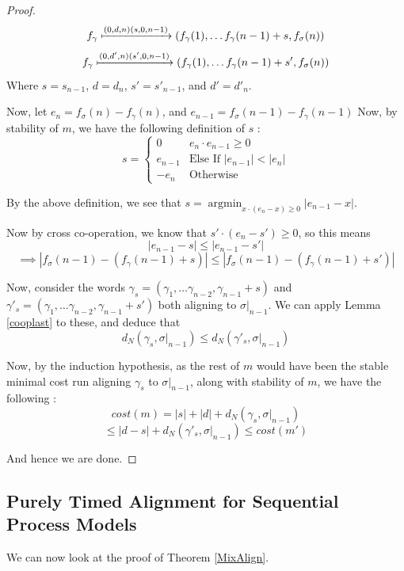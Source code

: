 \documentclass[conference]{IEEEtran}
\newcounter{cases}
\newcounter{subcases}[cases]
\newenvironment{mycase}
{
	\setcounter{cases}{0}
	\setcounter{subcases}{0}
	\newcommand{\case}
	{
		\par\indent\stepcounter{cases}\textbf{Case \thecases.}
	}
	\newcommand{\subcase}
	{
		\par\indent\stepcounter{subcases}\textbf{ \>\>\>\> Subcase (\thesubcases)}
	}
}
{
	\par
}
\renewcommand*\thecases{\arabic{cases}}
\renewcommand*\thesubcases{\alph{subcases}}
\DeclareMathOperator*{\argmin}{argmin}
\begin{document}
\begin{proof}
\begin{mycase}
$$f_\gamma \xmapsto{(0, d, n)(s, 0, n-1)} (f_\gamma(1), \dots f_\gamma(n-1) + s, f_\sigma(n))$$
$$f_\gamma \xmapsto{(0, d', n)(s', 0, n-1)} (f_\gamma(1), \dots f_\gamma(n-1) + s', f_\sigma(n))$$
Where $s = s_{n-1}$, $d = d_n$, $s' = s'_{n-1}$, and $d' = d'_n$. 

Now, let $e_n = f_\sigma(n) - f_\gamma(n)$, and $e_{n-1} = f_\sigma(n-1) - f_\gamma(n-1)$
Now, by stability of $m$, we have the following definition of $s$ : 
$$s = \begin{cases}
	0 & e_n\cdot e_{n-1} \geq 0 \\
	e_{n-1} & \textrm{Else If }|e_{n-1}| < |e_n| \\
	-e_n & \textrm{Otherwise}
\end{cases}$$

By the above definition, we see that $s = \argmin_{x \cdot (e_n - x) \geq 0} {|e_{n-1} - x|}$. 

Now by cross co-operation, we know that $s' \cdot (e_n - s') \geq 0$, so this means $$|e_{n-1} - s| \leq |e_{n-1} - s'| $$$$\implies |f_\sigma(n-1) - (f_\gamma(n-1) + s)| \leq |f_\sigma(n-1) - (f_\gamma(n-1) + s')|$$

Now, consider the words $\gamma_s = (\gamma_1, \dots \gamma_{n-2}, \gamma_{n-1} + s)$ and 
$\gamma'_s = (\gamma_1, \dots \gamma_{n-2}, \gamma_{n-1} + s')$ both aligning to $\sigma|_{n-1}$. We can apply Lemma \ref{cooplast} to these, and deduce that $$d_N(\gamma_s, \sigma|_{n-1}) \leq d_N(\gamma'_s, \sigma|_{n-1})$$

Now, by the induction hypothesis, as the rest of $m$ would have been the stable minimal cost run aligning $\gamma_s$ to $\sigma|_{n-1}$, along with stability of $m$, we have the following : 
$$cost(m) = |s| + |d| + d_N(\gamma_s, \sigma|_{n-1})$$$$ \leq |d-s| + d_N(\gamma'_s, \sigma|_{n-1}) \leq cost(m')$$

And hence we are done. 
\end{mycase}

\end{proof}


\subsection{Purely Timed Alignment for Sequential Process Models} 
We can now look at the proof of Theorem \ref{MixAlign}. 
\end{document}
